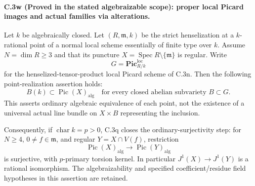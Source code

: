 \paragraph{C.3w (Proved in the stated algebraizable scope): proper local Picard images and actual families via alterations.}
Let $k$ be algebraically closed. Let $(R,\mathfrak m,k)$
be the strict henselization at a $k$-rational point of
a normal local scheme essentially of finite type over
$k$. Assume $N=\dim R\ge3$ and that its puncture
$X=\operatorname{Spec}R\setminus\{\mathfrak m\}$ is
regular. Write
\[
                   G=\mathbf{Pic}^{\mathrm{loc}}_{R/k}
\]
for the henselized-tensor-product local Picard scheme
of C.3n. Then the following point-realization assertion holds:
\begin{equation}\label{eq:C3-proper-local-image-ordinary}
 B(k)\subset\operatorname{Pic}(X)_{\mathrm{alg}}
              \quad\text{for every closed abelian subvariety }B\subset G.
\end{equation}
This asserts ordinary algebraic equivalence of each
point, not the existence of a universal actual line
bundle on $X\times B$ representing the inclusion.

Consequently, if $\operatorname{char}k=p>0$,
C.3q closes the ordinary-surjectivity step:
for $N\ge4$,
$0\ne f\in\mathfrak m$, and regular
$Y=X\cap V(f)$, restriction
\begin{equation}\label{eq:C3-charp-ordinary-isomorphism}
 \operatorname{Pic}(X)_{\mathrm{alg}}
       \longrightarrow\operatorname{Pic}(Y)_{\mathrm{alg}}
\end{equation}
is surjective, with $p$-primary torsion kernel.
In particular $J^1(X)\to J^1(Y)$ is a rational
isomorphism. The algebraizability and specified
coefficient/residue field hypotheses in this
assertion are retained.

